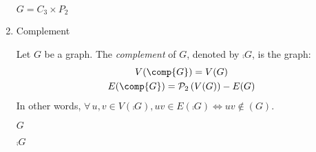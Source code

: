\documentclass[letterpaper,12pt,fleqn]{article}
\begin{document}
\begin{enumerate}[left=0pt]
\begin{example}
\begin{minipage}{3in}
\begin{center}
        \bigskip
        
        \(G=C_3\times P_2\)
      \end{center}
    \end{minipage}
  \end{example}
  
\item Complement
  
  \begin{definition}[Complement]
    Let \(G\) be a graph.  The \emph{complement} of \(G\), denoted by \(\comp{G}\), is the graph:
    \begin{gather*}
      V(\comp{G})=V(G) \\
      E(\comp{G})=\ps_2\left(V(G)\right)-E(G)
    \end{gather*}
    In other words, \(\forall\,u,v\in V(\comp{G}),uv\in E(\comp{G})\iff uv\notin (G)\).
  \end{definition}

  \begin{example}
    \begin{minipage}{2in}
      \begin{center}

        \bigskip

        \(G\)
      \end{center}
    \end{minipage}
    \begin{minipage}{2in}
      \begin{center}

        \bigskip

        \(\comp{G}\)
      \end{center}
    \end{minipage}
  \end{example}

\end{enumerate}
\end{document}
